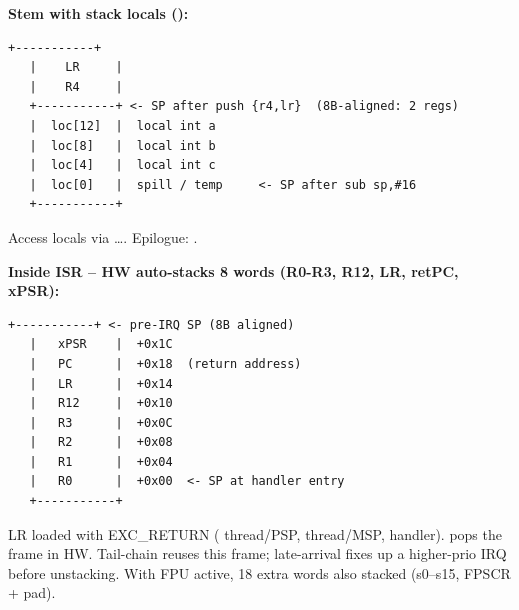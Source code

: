 \textbf{Stem with stack locals ():}
\begin{lstlisting}[language={}]
   +-----------+
   |    LR     |
   |    R4     |
   +-----------+ <- SP after push {r4,lr}  (8B-aligned: 2 regs)
   |  loc[12]  |  local int a
   |  loc[8]   |  local int b
   |  loc[4]   |  local int c
   |  loc[0]   |  spill / temp     <- SP after sub sp,#16
   +-----------+
\end{lstlisting}
Access locals via \asm{[sp,\#0]}\dots\asm{[sp,\#12]}. Epilogue: .

\textbf{Inside ISR -- HW auto-stacks 8 words (R0-R3, R12, LR, retPC, xPSR):}
\begin{lstlisting}[language={}]
   +-----------+ <- pre-IRQ SP (8B aligned)
   |   xPSR    |  +0x1C
   |   PC      |  +0x18  (return address)
   |   LR      |  +0x14
   |   R12     |  +0x10
   |   R3      |  +0x0C
   |   R2      |  +0x08
   |   R1      |  +0x04
   |   R0      |  +0x00  <- SP at handler entry
   +-----------+
\end{lstlisting}
LR loaded with EXC\_RETURN ( thread/PSP,  thread/MSP,  handler).  pops the frame in HW. Tail-chain reuses this frame; late-arrival fixes up a higher-prio IRQ before unstacking. With FPU active, 18 extra words also stacked (s0--s15, FPSCR + pad).

